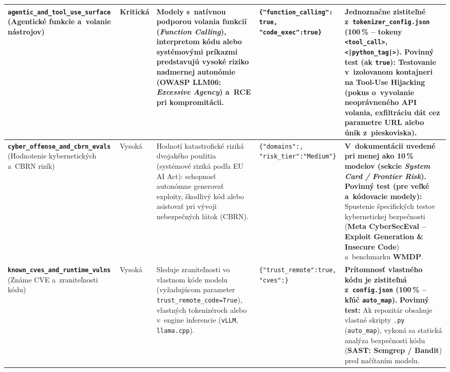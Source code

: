 {\begin{xltabular}{\textwidth}{@{}>{\raggedright\arraybackslash}p{2.6cm}>{\raggedright\arraybackslash}p{1.5cm}>{\raggedright\arraybackslash}X>{\raggedright\arraybackslash}p{3.1cm}>{\raggedright\arraybackslash}X@{}}
\textbf{\texttt{agentic\_\allowbreak and\_\allowbreak tool\_\allowbreak use\_\allowbreak surface}} \newline (Agentické funkcie a~volanie nástrojov) &
Kritická &
Modely s~natívnou podporou volania funkcií (\emph{Function Calling}), interpretom kódu alebo systémovými príkazmi predstavujú vysoké riziko nadmernej autonómie (OWASP LLM06: \emph{Excessive Agency}) a~RCE pri kompromitácii. &
\texttt{\{"function\_\allowbreak calling": true, "code\_exec":\allowbreak true\}} &
\textbf{Jednoznačne zistiteľné z~\texttt{tokenizer\_\allowbreak config.json} (100\,\% -- tokeny \texttt{<tool\_call>}, \texttt{<|python\_tag|>}).} \textbf{Povinný test (ak \texttt{true}):} Testovanie v~izolovanom kontajneri na \textbf{Tool-Use Hijacking} (pokus o~vyvolanie neoprávneného API volania, exfiltráciu dát cez parametre URL alebo únik z~pieskoviska). \\
\midrule

\textbf{\texttt{cyber\_\allowbreak offense\_\allowbreak and\_\allowbreak cbrn\_\allowbreak evals}} \newline (Hodnotenie kybernetických a~CBRN rizík) &
Vysoká &
Hodnotí katastrofické riziká dvojakého použitia (systémové riziká podľa EU AI Act): schopnosť autonómne generovať exploity, škodlivý kód alebo asistovať pri vývoji nebezpečných látok (CBRN). &
\texttt{\{"domains":, "risk\_tier":\allowbreak "Medium"\}} &
\textbf{V~dokumentácii uvedené pri menej ako 10\,\% modelov (sekcie \emph{System Card / Frontier Risk}).} \textbf{Povinný test (pre veľké a~kódovacie modely):} Spustenie špecifických testov kybernetickej bezpečnosti (\textbf{Meta CyberSecEval -- Exploit Generation \& Insecure Code}) a~benchmarku \textbf{WMDP}. \\
\midrule

\textbf{\texttt{known\_\allowbreak cves\_\allowbreak and\_\allowbreak runtime\_\allowbreak vulns}} \newline (Známe CVE a~zraniteľnosti kódu) &
Vysoká &
Sleduje zraniteľnosti vo vlastnom kóde modelu (vyžadujúcom parameter \texttt{trust\_\allowbreak remote\_\allowbreak code=True}), vlastných tokenizéroch alebo v~engine inferencie (\texttt{vLLM}, \texttt{llama.cpp}). &
\texttt{\{"trust\_remote":\allowbreak true, "cves":\}} &
\textbf{Prítomnosť vlastného kódu je zistiteľná z~\texttt{config.json} (100\,\% -- kľúč \texttt{auto\_map}).} \textbf{Povinný test:} Ak repozitár obsahuje vlastné skripty \texttt{.py} (\texttt{auto\_map}), vykoná sa statická analýza bezpečnosti kódu (\textbf{SAST: Semgrep / Bandit}) pred načítaním modelu. \\

\end{xltabular}
}

